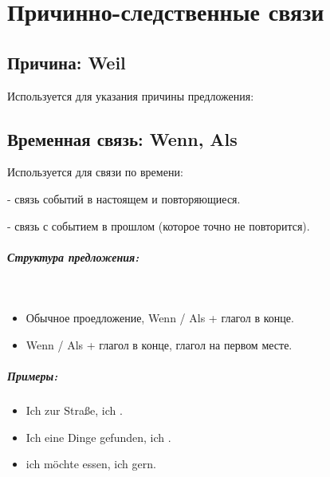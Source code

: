 \chapter{Причинно-следственные связи}

\section{Причина: Weil}

Используется для указания причины предложения: 

\section{Временная связь: Wenn, Als}

Используется для связи по времени:

 - связь событий в настоящем и повторяющиеся. 

 - связь с событием в прошлом (которое точно не повторится). 

\paragraph{Структура предложения:} ~\\
\begin{itemize}
\item Обычное проедложение, Wenn / Als + глагол в конце.
\item Wenn / Als + глагол в конце, глагол на первом месте.
\end{itemize}

\paragraph{Примеры:}
\begin{itemize}
\item Ich  zur Straße,  ich .
~\\ 
\item Ich  eine Dinge gefunden,  ich .
~\\ 
\item {} ich möchte essen,  ich gern.
~\\ 
\end{itemize}


